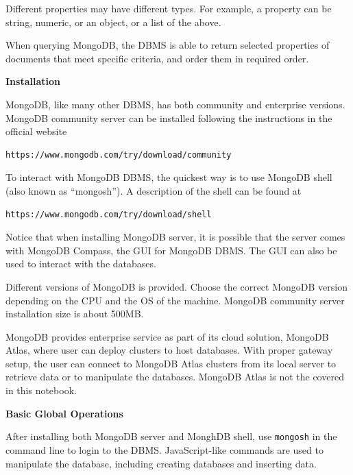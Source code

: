 Different properties may have different types. For example, a property can be string, numeric, or an object, or a list of the above.

When querying MongoDB, the DBMS is able to return selected properties of documents that meet specific criteria, and order them in required order.

\vspace{0.1in}
\noindent \textbf{Installation}
\vspace{0.1in}

MongoDB, like many other DBMS, has both community and enterprise versions. MongoDB community server can be installed following the instructions in the official website
\begin{lstlisting}
https://www.mongodb.com/try/download/community
\end{lstlisting}
To interact with MongoDB DBMS, the quickest way is to use MongoDB shell (also known as ``mongosh''). A description of the shell can be found at
\begin{lstlisting}
https://www.mongodb.com/try/download/shell
\end{lstlisting}
Notice that when installing MongoDB server, it is possible that the server comes with MongoDB Compass, the GUI for MongoDB DBMS. The GUI can also be used to interact with the databases.

Different versions of MongoDB is provided. Choose the correct MongoDB version depending on the CPU and the OS of the machine. MongoDB community server installation size is about 500MB.

MongoDB provides enterprise service as part of its cloud solution, MongoDB Atlas, where user can deploy clusters to host databases. With proper gateway setup, the user can connect to MongoDB Atlas clusters from its local server to retrieve data or to manipulate the databases. MongoDB Atlas is not the covered in this notebook.

\vspace{0.1in}
\noindent \textbf{Basic Global Operations}
\vspace{0.1in}

After installing both MongoDB server and MonghDB shell, use \verb|mongosh| in the command line to login to the DBMS. JavaScript-like commands are used to manipulate the database, including creating databases and inserting data.

